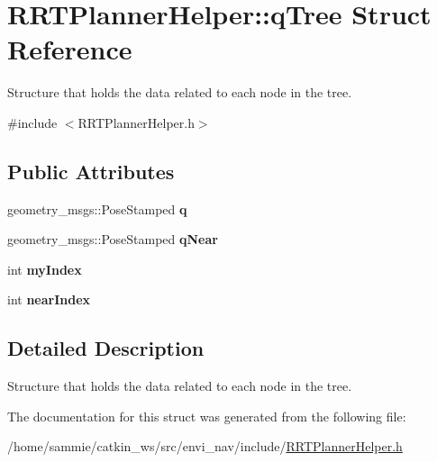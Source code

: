 \hypertarget{structRRTPlannerHelper_1_1qTree}{}\section{R\+R\+T\+Planner\+Helper\+:\+:q\+Tree Struct Reference}
\label{structRRTPlannerHelper_1_1qTree}


Structure that holds the data related to each node in the tree.  




{\ttfamily \#include $<$R\+R\+T\+Planner\+Helper.\+h$>$}

\subsection*{Public Attributes}
\begin{DoxyCompactItemize}
\item 
geometry\+\_\+msgs\+::\+Pose\+Stamped {\bfseries q}\hypertarget{structRRTPlannerHelper_1_1qTree_afe0b03af9e2d1fbf0a71207303a99dd0}{}\label{structRRTPlannerHelper_1_1qTree_afe0b03af9e2d1fbf0a71207303a99dd0}

\item 
geometry\+\_\+msgs\+::\+Pose\+Stamped {\bfseries q\+Near}\hypertarget{structRRTPlannerHelper_1_1qTree_ab45c90035886f2862897e6ace143e124}{}\label{structRRTPlannerHelper_1_1qTree_ab45c90035886f2862897e6ace143e124}

\item 
int {\bfseries my\+Index}\hypertarget{structRRTPlannerHelper_1_1qTree_a94fbaf1d1f0bda6456755d120156b5c5}{}\label{structRRTPlannerHelper_1_1qTree_a94fbaf1d1f0bda6456755d120156b5c5}

\item 
int {\bfseries near\+Index}\hypertarget{structRRTPlannerHelper_1_1qTree_a47ba5cc49b37e19fcff618edc82f54a5}{}\label{structRRTPlannerHelper_1_1qTree_a47ba5cc49b37e19fcff618edc82f54a5}

\end{DoxyCompactItemize}


\subsection{Detailed Description}
Structure that holds the data related to each node in the tree. 

The documentation for this struct was generated from the following file\+:\begin{DoxyCompactItemize}
\item 
/home/sammie/catkin\+\_\+ws/src/envi\+\_\+nav/include/\hyperlink{RRTPlannerHelper_8h}{R\+R\+T\+Planner\+Helper.\+h}\end{DoxyCompactItemize}
